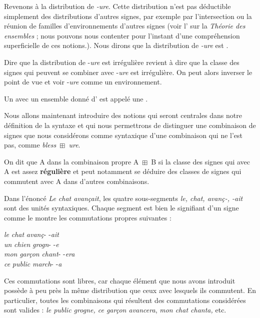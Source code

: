 Revenons à la distribution de \textit{{}-ure}. Cette distribution n’est pas déductible simplement des distributions d’autres signes, par exemple par l’intersection ou la réunion de familles d’environnements d’autres signes (voir l’ sur la \textit{Théorie des ensembles} ; nous pouvons nous contenter pour l’instant d’une compréhension superficielle de ces notions.). Nous dirons que la distribution de  \textit{{}-ure} est .

Dire que la distribution de -\textit{ure} est irrégulière revient à dire que la classe des signes qui peuvent se combiner avec -\textit{ure} est irrégulière.
On peut alors inverser le point de vue et voir -\textit{ure} comme un environnement.

{Un  avec un ensemble donné d’ est appelé une .}

Nous allons maintenant introduire des notions qui seront centrales dans notre définition de la syntaxe et qui nous permettrons de distinguer une combinaison de signes que nous considérons comme syntaxique d'une combinaison qui ne l'est pas, comme \textit{bless~}${\boxplus}$\textit{~ure}.

{On dit que A  dans la combinaison propre A~${\boxplus}$~B si la classe des signes qui  avec A est assez \textbf{régulière} et peut notamment se déduire des classes de signes qui commutent avec A dans d’autres combinaisons.}

Dans l’énoncé \textit{Le chat avançait}, les quatre sous-segments \textit{le, chat, avanç-, -ait} sont des unités syntaxiques. Chaque segment est bien le signifiant d’un signe comme le montre les commutations propres suivantes :

\ea\gllll  \textit{le}   \textit{chat}   \textit{avanç}-   -\textit{ait}\\
 \textit{un}   \textit{chien}   \textit{grogn}-   -\textit{e}\\
 \textit{mon}   \textit{garçon}   \textit{chant}-   -\textit{era}\\
 \textit{ce}   \textit{public}   \textit{march}-   -\textit{a}\\
\z

Ces commutations sont libres, car chaque élément que nous avons introduit possède à peu près la même distribution que ceux avec lesquels ils commutent. En particulier, toutes les combinaisons qui résultent des commutations considérées sont valides : \textit{le public grogne, ce garçon avancera}, \textit{mon chat chanta,} etc.

